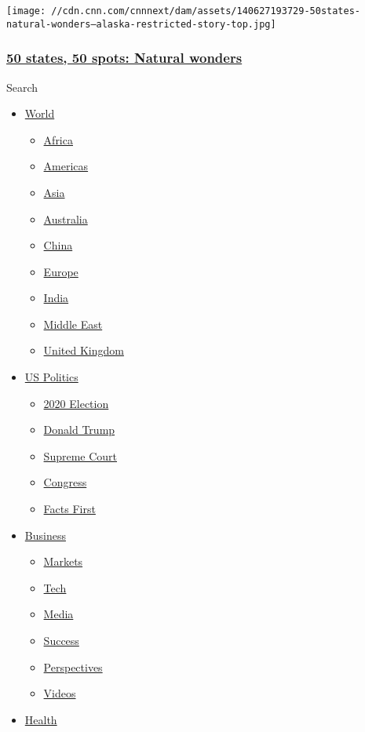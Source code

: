 \texttt{[image: //cdn.cnn.com/cnnnext/dam/assets/140627193729-50states-natural-wonders---alaska-restricted-story-top.jpg]}

\hypertarget{50-states-50-spots-natural-wonders}{%
\subsubsection{\texorpdfstring{\href{http://www.cnn.com/interactive/2014/07/travel/50-states-natural-wonders/index.html}{50
states, 50 spots: Natural
wonders}}{50 states, 50 spots: Natural wonders}}\label{50-states-50-spots-natural-wonders}}

Search

\begin{itemize}
\tightlist
\item
  \href{/world}{World}

  \begin{itemize}
  \tightlist
  \item
    \href{/africa}{Africa}
  \item
    \href{/americas}{Americas}
  \item
    \href{/asia}{Asia}
  \item
    \href{/australia}{Australia}
  \item
    \href{/china}{China}
  \item
    \href{/europe}{Europe}
  \item
    \href{/india}{India}
  \item
    \href{/middle-east}{Middle East}
  \item
    \href{/uk}{United Kingdom}
  \end{itemize}
\item
  \href{/politics}{US Politics}

  \begin{itemize}
  \tightlist
  \item
    \href{/election/2020}{2020 Election}
  \item
    \href{/specials/politics/president-donald-trump-45}{Donald Trump}
  \item
    \href{/specials/politics/supreme-court-nine}{Supreme Court}
  \item
    \href{/specials/politics/congress}{Congress}
  \item
    \href{/specials/politics/fact-check-politics}{Facts First}
  \end{itemize}
\item
  \href{/business}{Business}

  \begin{itemize}
  \tightlist
  \item
    \href{https://money.cnn.com/data/markets/}{Markets}
  \item
    \href{/business/tech}{Tech}
  \item
    \href{/business/media}{Media}
  \item
    \href{/business/success}{Success}
  \item
    \href{/business/perspectives}{Perspectives}
  \item
    \href{/business/videos}{Videos}
  \end{itemize}
\item
  \href{/health}{Health}


\end{itemize}

